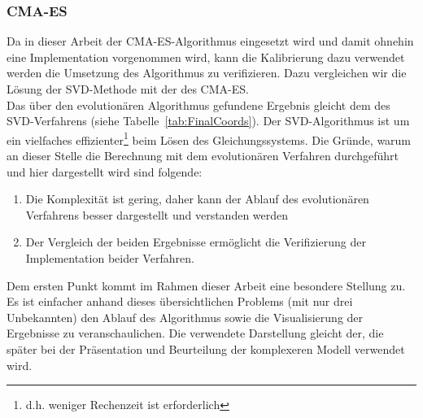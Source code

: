 \subsubsection{CMA-ES}
Da in dieser Arbeit der CMA-ES-Algorithmus eingesetzt wird und damit ohnehin eine Implementation vorgenommen wird, kann die Kalibrierung dazu verwendet werden die Umsetzung des Algorithmus zu verifizieren. Dazu vergleichen wir die Lösung der SVD-Methode mit der des CMA-ES.\\
Das über den evolutionären Algorithmus gefundene Ergebnis gleicht dem des SVD-Verfahrens (siehe Tabelle~\ref{tab:FinalCoords}). Der SVD-Algorithmus ist um ein vielfaches effizienter\footnote{d.h. weniger Rechenzeit ist erforderlich} beim Lösen des Gleichungssystems. Die Gründe, warum an dieser Stelle die Berechnung mit dem evolutionären Verfahren durchgeführt und hier dargestellt wird sind folgende:
%
\begin{enumerate}
 \item Die Komplexität ist gering, daher kann der Ablauf des evolutionären Verfahrens besser dargestellt und verstanden werden
 \item Der Vergleich der beiden Ergebnisse ermöglicht die Verifizierung der Implementation beider Verfahren.
\end{enumerate}
%
Dem ersten Punkt kommt im Rahmen dieser Arbeit eine besondere Stellung zu. Es ist einfacher anhand dieses übersichtlichen Problems (mit nur drei Unbekannten) den Ablauf des Algorithmus sowie die Visualisierung der Ergebnisse zu veranschaulichen. Die verwendete Darstellung gleicht der, die später bei der Präsentation und Beurteilung der komplexeren Modell verwendet wird.
%

%

%
